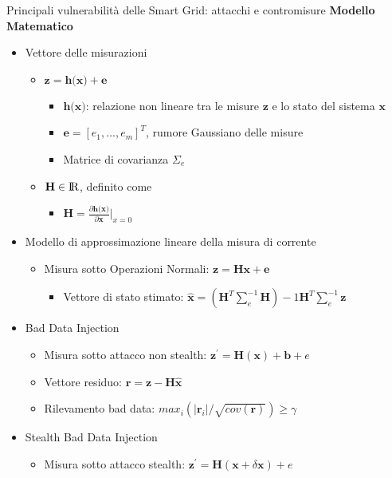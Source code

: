 \begin{frame}{Principali vulnerabilità delle Smart Grid: attacchi e contromisure}
\textbf{Modello Matematico}
\begin{itemize}[<+- | alert@+>]
	\item Vettore delle misurazioni
	\begin{itemize}
		\item $\textbf{z} = \textbf{h(x)} + \textbf{e}$
		\begin{itemize}
			\item $\textbf{h(x)}$: relazione non lineare tra le misure $\textbf{z}$ e lo stato del sistema $\textbf{x}$
			\item $\textbf{e} = [e_1, \ldots, e_m]^T$, rumore Gaussiano delle misure
			\item Matrice di covarianza $\Sigma_e$
		\end{itemize}
	\item $\textbf{H} \in {\rm I\!R}$, definito come
	\begin{itemize}
		\item $\textbf{H}=\frac{\partial\textbf{h(x)}}{\partial\textbf{x}}|_{x=0}$
	\end{itemize}
	\end{itemize}
	\item Modello di approssimazione lineare della misura di corrente
	\begin{itemize}
		\item Misura sotto Operazioni Normali: $\textbf{z} =  \textbf{Hx} + \textbf{e}$
		\begin{itemize}
			\item Vettore di stato stimato: $\widehat{\textbf{x}} = (\textbf{H}^T\sum_e^{-1}\textbf{H})-1\textbf{H}^T\sum_e^{-1}\textbf{z}$
		\end{itemize}
	\end{itemize}
	\item Bad Data Injection
	\begin{itemize}
		\item Misura sotto attacco non stealth: $\textbf{z}^\prime = \textbf{H}(\textbf{x}) + \textbf{b} + e$
		\item Vettore residuo: $\textbf{r} = \textbf{z} - \textbf{H}\widehat{\textbf{x}}$
		\item Rilevamento bad data: $max_i(|\textbf{r}_i|/\sqrt{cov(\textbf{r})}) \geq \gamma$
	\end{itemize}
	\item Stealth Bad Data Injection
	\begin{itemize}
		\item Misura sotto attacco stealth: $\textbf{z}^\prime = \textbf{H}(\textbf{x} + \delta\textbf{x}) + e$
	\end{itemize}
\end{itemize}
\end{frame}

